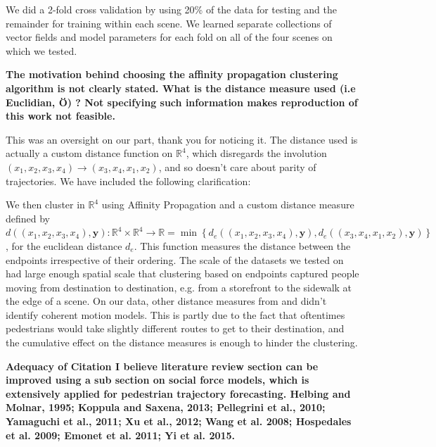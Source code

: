 \documentclass[usenames,dvipsnames]{article}
\providecommand{\response}[1]{
\noindent
\noindent\colorbox{gray!20}{
\parbox{\textwidth}{
\setlength{\parskip}{.1in}
\setlength{\parindent}{.1in}
#1}
}
}
\begin{document}
\begin{enumerate}
\response{We did a 2-fold cross validation by using 20\% of the data for testing and the remainder for training within each scene. We learned separate collections of vector fields and model parameters for each fold on all of the four scenes on which we tested.}


\begin{item}
\textbf{The motivation behind choosing the affinity propagation clustering
algorithm is not clearly stated. 
What is the distance measure used (i.e Euclidian, \"{O}) ? Not specifying
such information makes reproduction of this work not feasible. }

This was an oversight on our part, thank you for noticing it. The distance used is actually a custom distance function on $\mathbb{R}^4$, which disregards the involution $(x_1, x_2, x_3, x_4) \to (x_3, x_4, x_1, x_2)$, and so doesn't care about parity of trajectories. We have included the following clarification:

\response{We then cluster in $\mathbb{R}^4$ using Affinity Propagation \cite{FreyDueck2007} and a custom distance measure defined by $d((x_1, x_2, x_3, x_4),\mathbf{y}) : \mathbb{R}^4 \times \mathbb{R}^4 \to \mathbb{R} = \min \left\{ d_e((x_1, x_2, x_3, x_4), \mathbf{y}), d_e((x_3, x_4, x_1, x_2), \mathbf{y}) \right\}$, for the euclidean distance $d_e$. This function measures the distance between the endpoints irrespective of their ordering. The scale of the datasets we tested on had large enough spatial scale that clustering based on endpoints captured people moving from destination to destination, e.g. from a storefront to the sidewalk at the edge of a scene. On our data, other distance measures from \cite{Morris2009} and \cite{Lee2007} didn't identify coherent motion models. This is partly due to the fact that oftentimes pedestrians would take slightly different routes to get to their destination, and the cumulative effect on the distance measures is enough to hinder the clustering. }
	
\end{item}

\begin{item}
\textbf{Adequacy of Citation
I believe literature review section can be improved using a sub section
on social force models, which is extensively applied for pedestrian
trajectory forecasting. 
Helbing and Molnar, 1995; Koppula and Saxena, 2013; Pellegrini et al.,
2010; Yamaguchi et al., 2011; Xu et al., 2012; Wang et al. 2008;
Hospedales et al. 2009; Emonet et al. 2011; Yi et al. 2015.}
\end{item}


\end{enumerate}
\end{document}
